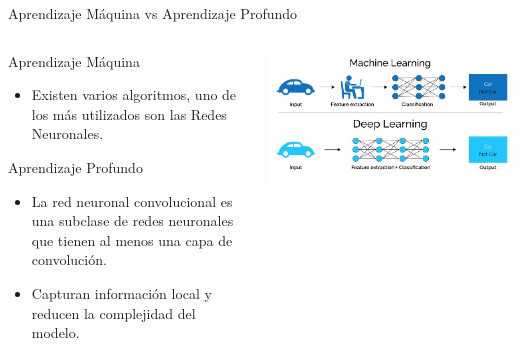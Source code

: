 \begin{frame}{Aprendizaje Máquina vs Aprendizaje Profundo}

		\begin{columns}
		\begin{column}{0.57\textwidth}
		\begin{block}{Aprendizaje Máquina} 
		\begin{itemize}
		\item Existen varios algoritmos, uno de los más utilizados son las Redes Neuronales.
		\end{itemize}
		\end{block} 
        \begin{block}{Aprendizaje Profundo} 
		\begin{itemize}
		\item La red neuronal convolucional es una subclase de redes neuronales que tienen al menos una capa de convolución. 
        \item Capturan información local y reducen la complejidad del modelo.
		\end{itemize}
		\end{block} 

		\end{column}
		\begin{column}{0.37\textwidth}  
			\begin{center}
			 \includegraphics[width=\textwidth]{Figs/MachineLearningVsDeepLearning}
			 \end{center}
		\end{column}
	\end{columns}
\end{frame}

